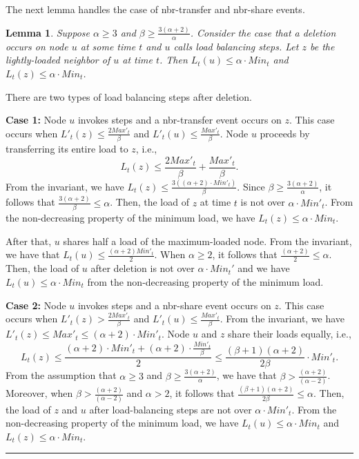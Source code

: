 \documentclass[a4paper]{article}
\newtheorem{lemma}{Lemma}
\newenvironment{proof}{{\bf Proof:}}{\hfill\rule{1.5mm}{3mm}\vspace{0.1in}}
\begin{document}
The next lemma handles the case of  nbr-transfer and nbr-share
events.

\begin{lemma}
  \label{lem:load-after-splitmax-splitnbr}
  Suppose $\alpha\geq 3$ and $\beta\geq
  \frac{3(\alpha+2)}{\alpha}$. Consider the case that a deletion occurs on node
  $u$ at some time $t$ and $u$ calls  load balancing steps. Let $z$
  be the lightly-loaded neighbor of $u$ at time $t$. Then
  $L_t(u)\leq \alpha\cdot Min_t$ and $L_t(z)\leq \alpha\cdot Min_t$.
\end{lemma}

\begin{proof}  
  There are two types of load balancing steps after deletion.

  \textbf{Case 1:} Node $u$ invokes {\splitmax} steps and a
  nbr-transfer event occurs on $z$.  This case occurs when
  $L'_t(z)\leq \frac{2Max'_t}{\beta}$ and $L'_t(u)\leq \frac{Max'_t}{\beta}$. Node $u$
  proceeds by transferring its entire load to $z$, i.e., 
  \[ L_t(z)\leq \frac{2Max'_t}{\beta}+\frac{Max'_t}{\beta}.\] 
  From the invariant, we have $L_t(z)\leq
  \frac{3((\alpha+2)\cdot Min'_t)}{\beta}$.  Since $\beta\geq
  \frac{3(\alpha+2)}{\alpha}$, it follows that $\frac{3(\alpha+2)}{\beta}\leq\alpha$.  Then,
  the load of $z$ at time $t$ is not over $\alpha\cdot Min'_t$. From
  the non-decreasing property of the minimum load, we have
  $L_t(z)\leq\alpha\cdot Min_t$.  
  
  After that, $u$ shares half a load
  of the maximum-loaded node. From the invariant, we have that
  $L_t(u)\leq \frac{(\alpha+2)Min'_t}{2}$. When $\alpha\geq 2$, it follows that
  $\frac{(\alpha+2)}{2}\leq\alpha$.  Then, the load of $u$ after deletion is
  not over $\alpha\cdot Min_t'$ and  we have $L_t(u)\leq
  \alpha\cdot Min_t$ from the non-decreasing property of the minimum load.

  \textbf{Case 2:} Node $u$ invokes {\splitnbr} steps and a
  nbr-share event occurs on $z$. This case occurs when $L'_t(z)>
  \frac{2Max'_t}{\beta}$ and $L'_t(u)\leq \frac{Max'_t}{\beta}$.  From the invariant,
  we have $L'_t(z)\leq Max'_t\leq (\alpha+2)\cdot Min'_t$. Node $u$
  and $z$ share their loads equally, i.e., 
  \[L_t(z)\leq
  \frac{(\alpha+2)\cdot Min'_t+(\alpha+2)\cdot \frac{Min'_t}{\beta}}{2} \leq
  \frac{(\beta+1)(\alpha+2)}{2\beta}\cdot Min'_t.\]
  From the assumption that $\alpha\geq 3$ and $\beta\geq
  \frac{3(\alpha+2)}{\alpha}$, we have that $\beta>\frac{(\alpha+2)}{(\alpha-2)}$.  
  Moreover, when $\beta>\frac{(\alpha+2)}{(\alpha-2)}$ and $\alpha>2$, it follows
  that $\frac{(\beta+1)(\alpha+2)}{2\beta}\leq\alpha$.  Then, the load
  of $z$ and $u$ after load-balancing steps are not over $\alpha\cdot
  Min'_t$. From the non-decreasing property of the minimum load, we have
  $L_t(u)\leq \alpha\cdot Min_t$ and $L_t(z)\leq \alpha\cdot Min_t$.  
\end{proof}
\end{document}
